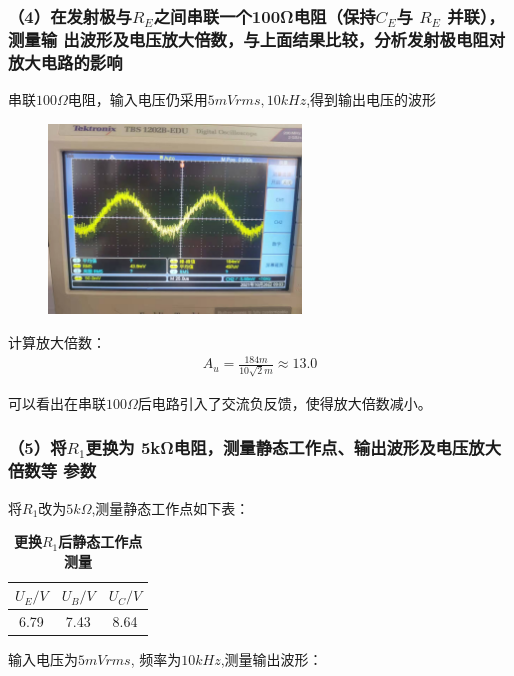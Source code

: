 \documentclass[UTF8]{ctexart}
\begin{document}
\subsubsection*{（4）在发射极与$R_E$之间串联一个100Ω电阻（保持$C_E$与 $R_E$ 并联），测量输
出波形及电压放大倍数，与上面结果比较，分析发射极电阻对放大电路的影响}

串联$100\Omega$电阻，输入电压仍采用$5mVrms, 10kHz$,得到输出电压的波形

\begin{figure}[htbp]
        \centering
        \includegraphics[width=0.60\textwidth]{2-4.jpg}
\end{figure}

计算放大倍数：
\begin{align}
        A_u = \frac{184m}{10\sqrt{2}m} \approx 13.0     
\end{align}

可以看出在串联$100 \Omega$后电路引入了交流负反馈，使得放大倍数减小。


\subsubsection*{（5）将$R_1$更换为 5kΩ电阻，测量静态工作点、输出波形及电压放大倍数等
参数}

将$R_1$改为$5k \Omega$,测量静态工作点如下表：

\begin{table}[H]
    \centering
    \caption{\label{表5}\textbf{更换$R_1$后静态工作点测量}}
    \begin{tabular}{ccc}
    \toprule
            $U_E/V$ & $U_B/V$ &  $U_C/V$\\
    \midrule
            6.79 & 7.43 & 8.64 \\            
    \bottomrule
    \end{tabular}
\end{table}

输入电压为$5mVrms$, 频率为$10kHz$,测量输出波形：
\end{document}
